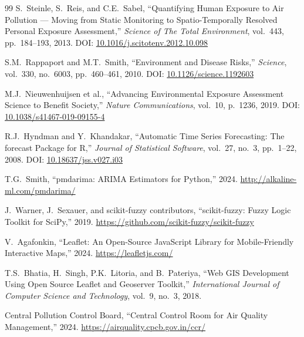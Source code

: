 \documentclass[12pt,a4paper]{report}
\begin{document}
\begin{thebibliography}{99}
S.~Steinle, S.~Reis, and C.E.~Sabel,
``Quantifying Human Exposure to Air Pollution --- Moving from Static Monitoring to Spatio-Temporally Resolved Personal Exposure Assessment,''
\textit{Science of The Total Environment}, vol.~443, pp.~184--193, 2013.
DOI: \href{https://doi.org/10.1016/j.scitotenv.2012.10.098}{10.1016/j.scitotenv.2012.10.098}

S.M.~Rappaport and M.T.~Smith,
``Environment and Disease Risks,''
\textit{Science}, vol.~330, no.~6003, pp.~460--461, 2010.
DOI: \href{https://doi.org/10.1126/science.1192603}{10.1126/science.1192603}

M.J.~Nieuwenhuijsen et al.,
``Advancing Environmental Exposure Assessment Science to Benefit Society,''
\textit{Nature Communications}, vol.~10, p.~1236, 2019.
DOI: \href{https://doi.org/10.1038/s41467-019-09155-4}{10.1038/s41467-019-09155-4}

R.J.~Hyndman and Y.~Khandakar,
``Automatic Time Series Forecasting: The forecast Package for R,''
\textit{Journal of Statistical Software}, vol.~27, no.~3, pp.~1--22, 2008.
DOI: \href{https://doi.org/10.18637/jss.v027.i03}{10.18637/jss.v027.i03}

T.G.~Smith,
``pmdarima: ARIMA Estimators for Python,''
2024. \url{http://alkaline-ml.com/pmdarima/}

J.~Warner, J.~Sexauer, and scikit-fuzzy contributors,
``scikit-fuzzy: Fuzzy Logic Toolkit for SciPy,''
2019. \url{https://github.com/scikit-fuzzy/scikit-fuzzy}

V.~Agafonkin,
``Leaflet: An Open-Source JavaScript Library for Mobile-Friendly Interactive Maps,''
2024. \url{https://leafletjs.com/}

T.S.~Bhatia, H.~Singh, P.K.~Litoria, and B.~Pateriya,
``Web GIS Development Using Open Source Leaflet and Geoserver Toolkit,''
\textit{International Journal of Computer Science and Technology}, vol.~9, no.~3, 2018.

Central Pollution Control Board,
``Central Control Room for Air Quality Management,''
2024. \url{https://airquality.cpcb.gov.in/ccr/}

\end{thebibliography}
\end{document}
